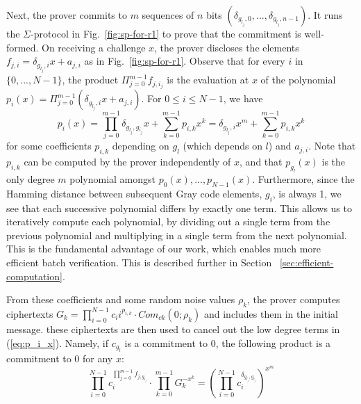 \documentclass{article}
\begin{document}
Next, the prover commits to $m$ sequences of $n$ bits $(\delta_{g_{l_j},0},...,\delta_{g_{l_j},n-1})$. It runs the $\Sigma$-protocol in Fig.~\ref{fig:sp-for-r1} to prove that the commitment is well-formed. On receiving a challenge $x$, the prover discloses the elements $f_{j,i}=\delta_{g_{l_j},i}x+a_{j,i}$ as in Fig.~\ref{fig:sp-for-r1}. Observe that for every $i$ in $\{0,...,N-1\}$, the product $\Pi_{j=0}^{m-1} f_{j,i_j}$ is the evaluation at $x$ of the polynomial $p_i(x) = \Pi_{j=0}^{m-1}(\delta_{g_{l_j},i}x+a_{j,i})$. For $0 \leq i \leq N-1$, we have
\begin{equation} \label{eq:p_i_x}
    p_i(x) = \prod_{j=0}^{m-1} \delta_{g_{l_j},g_{i_j}}x + \sum_{k=0}^{m-1}p_{i,k}x^k = \delta_{g_{l_j},i}x^m + \sum_{k=0}^{m-1}p_{i,k}x^k
\end{equation}
for some coefficients $p_{i,k}$ depending on $g_l$ (which depends on $l$) and $a_{j,i}$. Note that $p_{i,k}$ can be computed by the prover independently of $x$, and that $p_{g_l}(x)$ is the only degree $m$ polynomial amongst $p_0(x),...,p_{N-1}(x)$. Furthermore, since the Hamming distance between subsequent Gray code elements, $g_i$, is always 1, we see that each successive polynomial differs by exactly one term. This allows us to iteratively compute each polynomial, by dividing out a single term from the previous polynomial and multiplying in a single term from the next polynomial. This is the fundamental advantage of our work, which enables much more efficient batch verification. This is described further in Section ~\ref{sec:efficient-computation}.

From these coefficients and some random noise values $\rho_k$, the prover computes ciphertexts $G_k = \prod_{i=0}^{N-1} c_ii^{p_{i,k}} \cdot Com_{ck}(0;\rho_k)$ and includes them in the initial message. these ciphertexts are then used to cancel out the low degree terms in (\ref{eq:p_i_x}). Namely, if $c_{g_l}$ is a commitment to 0, the following product is a commitment to 0 for any $x$:
$$\prod_{i=0}^{N-1}c_i^{\prod_{j=0}^{m-1}f_{j,g_{i_j}}} \cdot \prod_{k=0}^{m-1}G_k^{-x^k} = \left(\prod_{i=0}^{N-1}c_i^{\delta_{g_{l_j},g_{i_j}}}\right)^{x^m}$$
\end{document}
